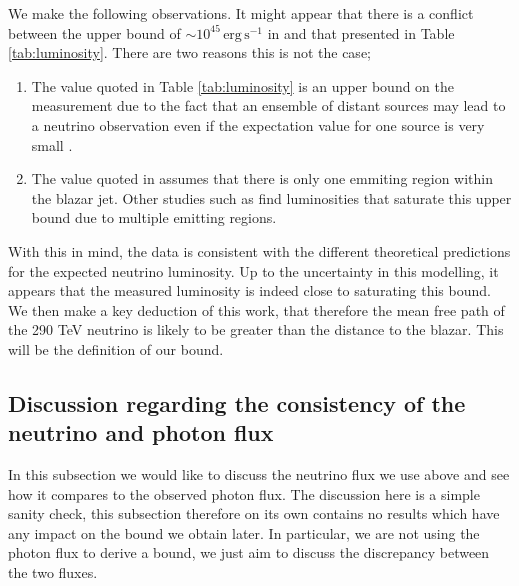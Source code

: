 \documentclass[11pt]{article}
\numberwithin{equation}{section}
\numberwithin{figure}{section}
\numberwithin{table}{section}
\begin{document}
We make the following observations. It might appear that there is a conflict between the upper bound of $\sim 10^{45} \,\textrm{erg}\,\textrm{s}^{-1}$ in \cite{Padovani2019} and that presented in Table \ref{tab:luminosity}. There are two reasons this is not the case;
\begin{enumerate}
    \item The value quoted in Table \ref{tab:luminosity} is an upper bound on the measurement due to the fact that an ensemble of distant sources may lead to a neutrino observation even if the expectation value for one source is very small \cite{Padovani2019}.
    \item The value quoted in \cite{Padovani2019} assumes that there is only one emmiting region within the blazar jet. Other studies such as \cite{Murase2014} find luminosities that saturate this upper bound due to multiple emitting regions.
\end{enumerate}
With this in mind, the data is consistent with the different theoretical predictions for the expected neutrino luminosity. Up to the uncertainty in this modelling, it appears that the measured luminosity is indeed close to saturating this bound. We then make a key deduction of this work, that therefore the mean free path of the 290 TeV neutrino is likely to be greater than the distance to the blazar. This will be the definition of our bound.


\subsection{Discussion regarding the consistency of the neutrino and photon flux}

In this subsection we would like to discuss the neutrino flux we use above and see how it compares to the observed photon flux.  The discussion here is a simple sanity check, this subsection therefore on its own contains no results which have any impact on the bound we obtain later. In particular, we are not using the photon flux to derive a bound, we just aim to discuss the discrepancy between the two fluxes.
\end{document}
